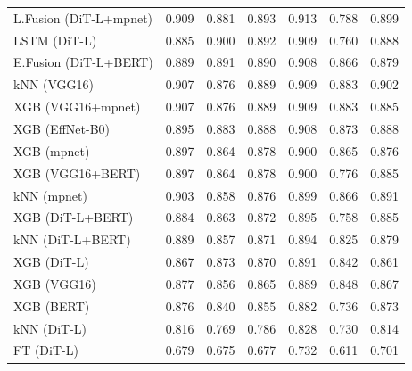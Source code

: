 \begin{longtable}{lrrrrrr}
L.Fusion (DiT-L+mpnet) & 0.909 & 0.881 & 0.893 & 0.913 & 0.788 & 0.899 \\
LSTM (DiT-L) & 0.885 & 0.900 & 0.892 & 0.909 & 0.760 & 0.888 \\
E.Fusion (DiT-L+BERT) & 0.889 & 0.891 & 0.890 & 0.908 & 0.866 & 0.879 \\
kNN (VGG16) & 0.907 & 0.876 & 0.889 & 0.909 & 0.883 & 0.902 \\
XGB (VGG16+mpnet) & 0.907 & 0.876 & 0.889 & 0.909 & 0.883 & 0.885 \\
XGB (EffNet-B0) & 0.895 & 0.883 & 0.888 & 0.908 & 0.873 & 0.888 \\
XGB (mpnet) & 0.897 & 0.864 & 0.878 & 0.900 & 0.865 & 0.876 \\
XGB (VGG16+BERT) & 0.897 & 0.864 & 0.878 & 0.900 & 0.776 & 0.885 \\
kNN (mpnet) & 0.903 & 0.858 & 0.876 & 0.899 & 0.866 & 0.891 \\
XGB (DiT-L+BERT) & 0.884 & 0.863 & 0.872 & 0.895 & 0.758 & 0.885 \\
kNN (DiT-L+BERT) & 0.889 & 0.857 & 0.871 & 0.894 & 0.825 & 0.879 \\
XGB (DiT-L) & 0.867 & 0.873 & 0.870 & 0.891 & 0.842 & 0.861 \\
XGB (VGG16) & 0.877 & 0.856 & 0.865 & 0.889 & 0.848 & 0.867 \\
XGB (BERT) & 0.876 & 0.840 & 0.855 & 0.882 & 0.736 & 0.873 \\
kNN (DiT-L) & 0.816 & 0.769 & 0.786 & 0.828 & 0.730 & 0.814 \\
FT (DiT-L) & 0.679 & 0.675 & 0.677 & 0.732 & 0.611 & 0.701 \\
\end{longtable}

